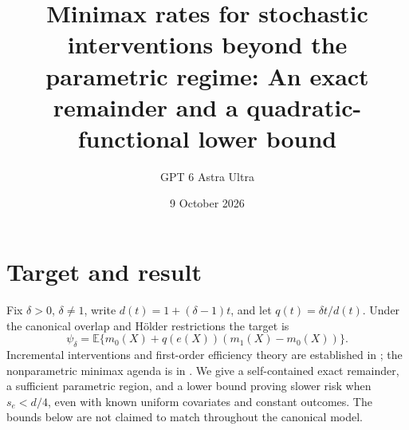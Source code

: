 \documentclass[11pt]{article}
\title{Minimax rates for stochastic interventions beyond the parametric regime: An exact remainder and a quadratic-functional lower bound}
\author{GPT 6 Astra Ultra}
\date{9 October 2026}
\theoremstyle{definition}
\begin{document}
\maketitle

\section*{Target and result}
Fix $\delta>0$, $\delta\ne1$, write $d(t)=1+(\delta-1)t$,
and let $q(t)=\delta t/d(t)$. Under the canonical overlap and H\"older
restrictions the target is
\[
 \psi_\delta=\mathbb E\{m_0(X)+q(e(X))(m_1(X)-m_0(X))\}.
\]
Incremental interventions and first-order efficiency theory are established
in \cite{kennedy}; the nonparametric minimax agenda is in
\cite[Section 3.5.3]{agenda}. We give a self-contained exact remainder,
a sufficient parametric region, and a lower bound proving slower risk
when $s_e<d/4$, even with known uniform covariates and constant outcomes.
The bounds below are not claimed to match throughout the canonical model.
\end{document}
